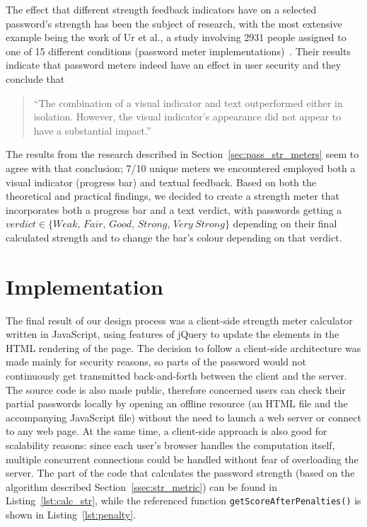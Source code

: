     The effect that different strength feedback indicators have on a selected password's strength has been the subject of research, with the most extensive example being the work of Ur et al., a study involving 2931 people assigned to one of 15 different conditions (password meter implementations)~\cite{strength_meter_effect}. Their results indicate that password meters indeed have an effect in user security and they conclude that
    \begin{quote}
    ``The combination of a visual indicator and text outperformed either in isolation. However, the visual indicator’s appearance did not appear to have a substantial impact.''
    \end{quote}

    The results from the research described in Section~\ref{sec:pass_str_meters} seem to agree with that conclusion; 7/10 unique meters we encountered employed both a visual indicator (progress bar) and textual feedback. Based on both the theoretical and practical findings, we decided to create a
    strength meter that incorporates both a progress bar and a text verdict, with passwords getting a $verdict \in \{Weak,\, Fair,\, Good,\, Strong,\, Very\ Strong\}$ depending on their final calculated strength and to change the bar's colour depending on that verdict.


\section{Implementation}
  \label{sec:implementation}
  The final result of our design process was a client-side strength meter calculator written in JavaScript, using features of jQuery to update the elements in the HTML rendering of the page. The decision to follow a client-side architecture was made mainly for security reasons, so parts of the password would not continuously get transmitted back-and-forth between the client and the server. The source code is also made public, therefore concerned users can check their partial passwords locally by opening an offline resource (an HTML file and the accompanying JavaScript file) without the need to launch a web server or connect to any web page. At the same time, a client-side approach is also good for scalability reasons: since each user's browser handles the computation itself, multiple concurrent connections could be handled without fear of overloading the server. The part of the code that calculates the password strength (based on the algorithm described Section~\ref{ssec:str_metric}) can be found in Listing~\ref{lst:calc_str}, while the referenced function \texttt{getScoreAfterPenalties()} is shown in Listing~\ref{lst:penalty}.

